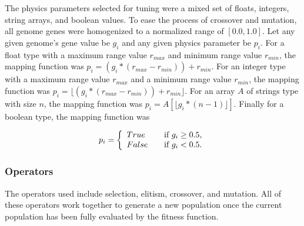 The physics parameters selected for tuning were a mixed set of floats, integers, string arrays, and boolean values. To ease the process of crossover and mutation, all genome genes were homogenized to a normalized range of $[0.0,1.0]$. Let any given genome's gene value be $g_i$ and any given physics parameter be $p_i$. For a float type with a maximum range value $r_{max}$ and minimum range value $r_{min}$, the mapping function was $p_i=(g_i*(r_{max}-r_{min}))+r_{min}$. For an integer type with a maximum range value $r_{max}$ and a minimum range value $r_{min}$, the mapping function was $p_i=\lfloor(g_i*(r_{max}-r_{min}))+r_{min}\rfloor$. For an array $A$ of strings type with size $n$, the mapping function was $p_i=A[\lfloor g_i*(n-1)\rfloor]$. Finally for a boolean type, the mapping function was 

\[ p_i = \left\{
\begin{array}{l l}
True & \quad \text{if $g_i\geq 0.5$,}\\
False & \quad \text{if $g_i < 0.5$.}
\end{array} 
\right.\]

\subsubsection{Operators}

The operators used include selection, elitism, crossover, and mutation. All of these operators work together to generate a new population once the current population has been fully evaluated by the fitness function.

